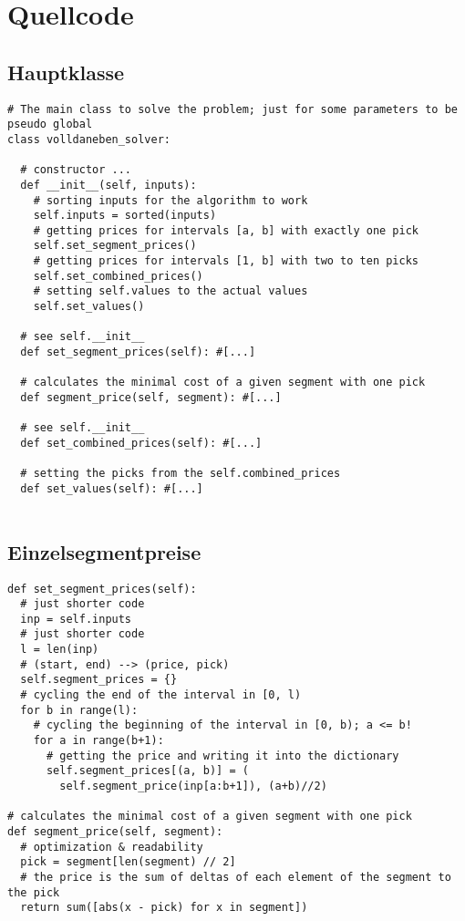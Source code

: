 \documentclass[a4paper,10pt,ngerman]{scrartcl}
\begin{document}
\section{Quellcode}
\subsection{Hauptklasse}
\begin{lstlisting}[frame=single]
# The main class to solve the problem; just for some parameters to be pseudo global
class volldaneben_solver:

  # constructor ...
  def __init__(self, inputs):
    # sorting inputs for the algorithm to work
    self.inputs = sorted(inputs)
    # getting prices for intervals [a, b] with exactly one pick
    self.set_segment_prices()
    # getting prices for intervals [1, b] with two to ten picks
    self.set_combined_prices()
    # setting self.values to the actual values
    self.set_values()

  # see self.__init__
  def set_segment_prices(self): #[...]

  # calculates the minimal cost of a given segment with one pick
  def segment_price(self, segment): #[...]

  # see self.__init__
  def set_combined_prices(self): #[...]

  # setting the picks from the self.combined_prices
  def set_values(self): #[...]
  
\end{lstlisting}
\subsection{Einzelsegmentpreise}
\begin{lstlisting}[frame=single]
def set_segment_prices(self):
  # just shorter code
  inp = self.inputs
  # just shorter code
  l = len(inp)
  # (start, end) --> (price, pick)
  self.segment_prices = {}
  # cycling the end of the interval in [0, l)
  for b in range(l):
    # cycling the beginning of the interval in [0, b); a <= b!
    for a in range(b+1):
      # getting the price and writing it into the dictionary
      self.segment_prices[(a, b)] = (
        self.segment_price(inp[a:b+1]), (a+b)//2)                       

# calculates the minimal cost of a given segment with one pick
def segment_price(self, segment):
  # optimization & readability
  pick = segment[len(segment) // 2]
  # the price is the sum of deltas of each element of the segment to the pick
  return sum([abs(x - pick) for x in segment])

 
\end{lstlisting}
\end{document}
